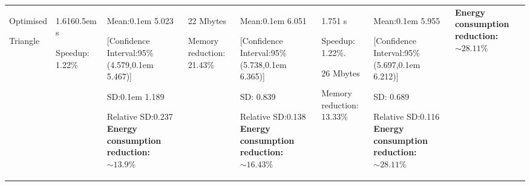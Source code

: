{\begin{longtable}{|p{1.15cm}|p{1.3cm}|p{1.8cm}|p{1.5cm}|p{1.8cm}|p{1.8cm}|p{1.8cm}|p{2.5cm}|}
  \cline{1-7}
  Optimised\par Triangle & 
  1.616\kern0.5em s\par \vspace{1em} Speedup: 1.22\% &
  Mean:\kern0.1em 5.023\par \vspace{.5em} [Confidence Interval:95\% (4.579,\kern0.1em 5.467)]\par \vspace{.5em} SD:\kern0.1em 1.189\par \vspace{.5em} Relative SD:0.237\vspace{.5em} \textbf{Energy consumption reduction: $\sim13.9\%$} \vspace{.5em} &
  22 Mbytes\par \vspace{.5em} Memory reduction: 21.43\% &
  Mean:\kern0.1em 6.051\par \vspace{.5em} [Confidence Interval:95\% (5.738,\kern0.1em  6.365)]\par \vspace{.5em} SD: 0.839\par \vspace{.5em} Relative SD:0.138\vspace{.5em} \textbf{Energy consumption reduction: $\sim 16.43\%$}\vspace{.5em}&
  1.751 s\par Speedup: 1.22\%.\par \vspace{.5em}
  26 Mbytes\par Memory reduction: 13.33\% &
  Mean:\kern0.1em 5.955\par \vspace{.5em} [Confidence Interval:95\% (5.697,\kern0.1em  6.212)]\par \vspace{.5em} SD: 0.689\par \vspace{.5em} Relative SD:0.116\vspace{.5em} \textbf{Energy consumption reduction: $\sim 28.11\%$}\vspace{.5em} &
  \textbf{Energy consumption reduction: $\sim 28.11\%$}
  \\
  

\end{longtable}}
